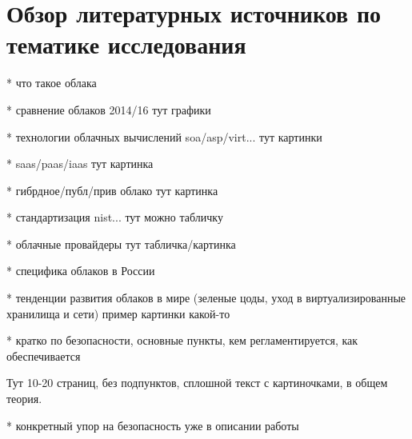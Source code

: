 \section{Обзор литературных источников по тематике исследования} \label{literature}


* что такое облака

* сравнение облаков 2014/16 тут графики

* технологии облачных вычислений soa/asp/virt... тут картинки

* saas/paas/iaas тут картинка

* гибрдное/публ/прив облако тут картинка

* стандартизация nist... тут можно табличку

* облачные провайдеры тут табличка/картинка

* специфика облаков в России

* тенденции развития облаков в мире (зеленые цоды, уход в виртуализированные хранилища и сети) пример картинки какой-то

* кратко по безопасности, основные пункты, кем регламентируется, как обеспечивается

Тут 10-20 страниц, без подпунктов, сплошной текст с картиночками, в общем теория.

* конкретный упор на безопасность уже в описании работы

\clearpage
